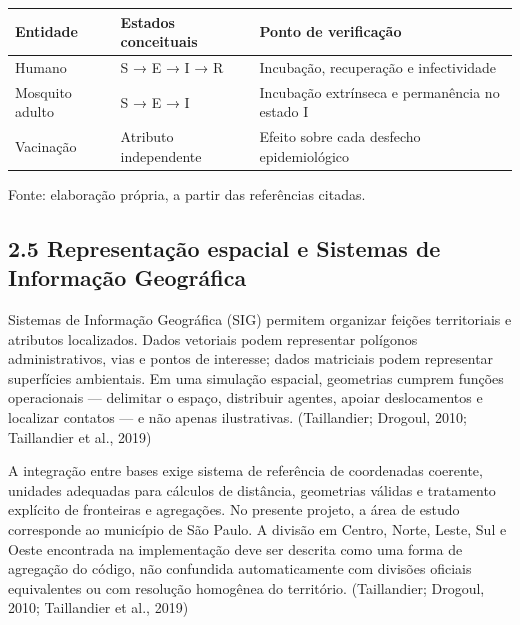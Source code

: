 \begin{longtable}[]{@{}
  >{\raggedright\arraybackslash}p{}
  >{\raggedright\arraybackslash}p{}
  >{\raggedright\arraybackslash}p{}@{}}
\toprule\noalign{}
\begin{minipage}[b]{\linewidth}\raggedright
\textbf{Entidade}
\end{minipage} & \begin{minipage}[b]{\linewidth}\raggedright
\textbf{Estados conceituais}
\end{minipage} & \begin{minipage}[b]{\linewidth}\raggedright
\textbf{Ponto de verificação}
\end{minipage} \\
\midrule\noalign{}
\endhead
\bottomrule\noalign{}
\endlastfoot
Humano & S → E → I → R & Incubação, recuperação e infectividade \\
Mosquito adulto & S → E → I & Incubação extrínseca e permanência no
estado I \\
Vacinação & Atributo independente & Efeito sobre cada desfecho
epidemiológico \\
\end{longtable}

Fonte: elaboração própria, a partir das referências citadas.

\subsection{2.5 Representação espacial e Sistemas de Informação
Geográfica}\label{representauxe7uxe3o-espacial-e-sistemas-de-informauxe7uxe3o-geogruxe1fica}

Sistemas de Informação Geográfica (SIG) permitem organizar feições
territoriais e atributos localizados. Dados vetoriais podem representar
polígonos administrativos, vias e pontos de interesse; dados matriciais
podem representar superfícies ambientais. Em uma simulação espacial,
geometrias cumprem funções operacionais --- delimitar o espaço,
distribuir agentes, apoiar deslocamentos e localizar contatos --- e não
apenas ilustrativas. (Taillandier; Drogoul, 2010; Taillandier et al.,
2019)

A integração entre bases exige sistema de referência de coordenadas
coerente, unidades adequadas para cálculos de distância, geometrias
válidas e tratamento explícito de fronteiras e agregações. No presente
projeto, a área de estudo corresponde ao município de São Paulo. A
divisão em Centro, Norte, Leste, Sul e Oeste encontrada na implementação
deve ser descrita como uma forma de agregação do código, não confundida
automaticamente com divisões oficiais equivalentes ou com resolução
homogênea do território. (Taillandier; Drogoul, 2010; Taillandier et
al., 2019)

